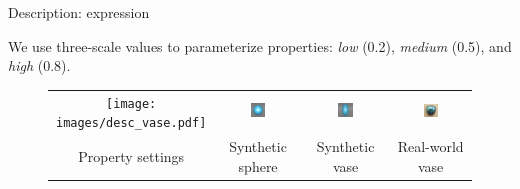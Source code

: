 \documentclass[10pt]{beamer}
\begin{document}
\begin{frame}{Description: expression}

We use three-scale values to parameterize properties: \textit{low} (0.2), \textit{medium} (0.5), and \textit{high} (0.8).

\begin{figure}[!htbp]
\centering
\begin{tabular}{cccc}
  \texttt{[image: images/desc\_vase.pdf]}&
  \includegraphics[width=0.2\textwidth]{interp/ui/ui_sphere.png}&
  \includegraphics[width=0.2\textwidth]{interp/ui/ui_vase.png}&
  \includegraphics[width=0.2\textwidth]{interp/real_world_img/vase/vase.jpg}\\
  Property settings & Synthetic sphere & Synthetic vase & Real-world vase\\
\end{tabular}
\end{figure}

\end{frame}
\end{document}
